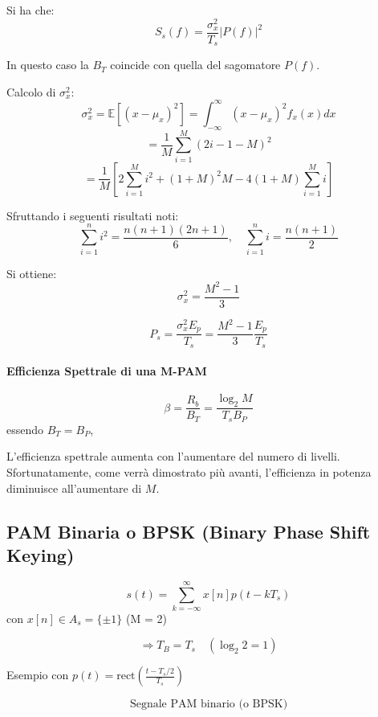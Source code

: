 Si ha che:
\[
    S_s(f) = \frac{\sigma_x^2}{T_s} |P(f)|^2
\]

In questo caso la $B_T$ coincide con quella del sagomatore $P(f)$.

Calcolo di $\sigma_x^2$:
\[
    \sigma_x^2 = \mathbb{E} \left[ (x - \mu_x)^2 \right] = \int_{-\infty}^{\infty} (x - \mu_x)^2 f_x(x) dx
\]
\[
    = \frac{1}{M} \sum_{i=1}^{M} (2i - 1 - M)^2
\]
\[
    = \frac{1}{M} \left[ 2 \sum_{i=1}^{M} i^2 + (1+M)^2 M - 4(1+M) \sum_{i=1}^{M} i \right]
\]

Sfruttando i seguenti risultati noti:
\[
    \sum_{i=1}^{n} i^2 = \frac{n(n+1)(2n+1)}{6}, \quad \sum_{i=1}^{n} i = \frac{n(n+1)}{2}
\]

Si ottiene:
\[
    \sigma_x^2 = \frac{M^2 - 1}{3}
\]

\[
    P_s = \frac{\sigma_x^2 E_p}{T_s} = \frac{M^2 - 1}{3} \frac{E_p}{T_s}
\]

\paragraph*{Efficienza Spettrale di una M-PAM}
\[
    \beta = \frac{R_b}{B_T} = \frac{\log_2 M}{T_s B_P}
\]
essendo \( B_T = B_P \),

L'efficienza spettrale aumenta con l'aumentare del numero di livelli. Sfortunatamente, come verrà dimostrato più avanti, l'efficienza in potenza diminuisce all'aumentare di \( M \).

\subsection*{PAM Binaria o BPSK (Binary Phase Shift Keying)}


\[
    s(t) = \sum_{k=-\infty}^{\infty} x[n] p(t - kT_s)
\]
con \( x[n] \in A_s = \{\pm 1\} \) (M = 2)

\[
    \Rightarrow T_B = T_s \quad (\log_2 2 = 1)
\]

Esempio con \( p(t) = \text{rect}\left(\frac{t-T_s/2}{T_s}\right) \)

\begin{center}

\end{center}
\[
    \text{Segnale PAM binario (o BPSK)}
\]

